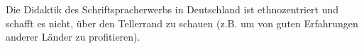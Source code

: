 Die Didaktik des Schriftspracherwerbs in Deutschland ist ethnozentriert und schafft es nicht, über den Tellerrand zu schauen (z.B. um von guten Erfahrungen anderer Länder zu profitieren).